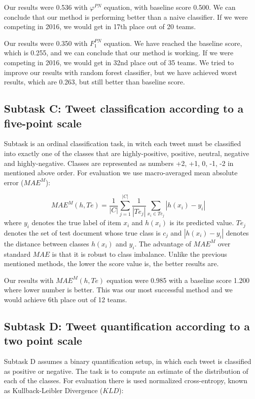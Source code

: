 \documentclass[runningheads,a4paper]{llncs}
\begin{document}
Our results were 0.536 with $\varphi^{PN}$ equation, with baseline score 0.500. We can conclude that our method is performing better than a naive classifier. If we were competing in 2016, we would get in 17th place out of 20 teams.

Our results were 0.350 with $F^{PN}_1$ equation. We have reached the baseline score, which is 0.255, and we can conclude that our method is working. If we were competing in 2016, we would get in 32nd place out of 35 teams. We tried to improve our results with random forest classifier, but we have achieved worst results, which are 0.263, but still better than baseline score. 

\subsection{Subtask C: Tweet classification according to a five-point scale}

Subtask is an ordinal classification task, in witch each tweet must be classified into exactly one of the classes that are highly-positive, positive, neutral, negative and highly-negative. Classes are represented as numbers {+2, +1, 0, -1, -2} in mentioned above order. For evaluation we use macro-averaged mean absolute error ($MAE^M$):

\begin{equation}
MAE^M(h, Te) = \frac{1}{|C|}\sum_{j=1}^{|C|}\frac{1}{|Te_j|}\sum_{x_i\in Te_j}|h(x_i) - y_i|
\end{equation}
where $y_i$ denotes the true label of item $x_i$ and $h(x_i)$ is its predicted value. $Te_j$ denotes the set of test document whose true class is $c_j$ and $|h(x_i) - y_i|$ denotes the distance between classes $h(x_i)$ and $y_i$. The advantage of $MAE^M$ over standard $MAE$ is that it is robust to class imbalance. Unlike the previous mentioned methods, the lower the score value is, the better results are. 

Our results with $MAE^M(h, Te)$ equation were 0.985 with a baseline score 1.200 where lower number is better. This was our most successful method and we would achieve 6th place out of 12 teams.

\subsection{Subtask D: Tweet quantification according to a two point scale}

Subtask D assumes a binary quantification setup, in which each tweet is classified as positive or negative. The task is to compute an estimate of the distribution of each of the classes. For evaluation there is used normalized cross-entropy, known as Kullback-Leibler Divergence ($KLD$):
\end{document}
